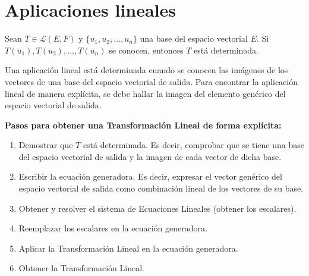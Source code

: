 \documentclass[compacto,10pt]{pubciencias-notas}
\begin{document}
\encabezado
\vspace*{-8mm}

\setcounter{section}{5}
\section{Aplicaciones lineales}
\setcounter{prop}{3}
\begin{prop}
    Sean $T \in \mathscr{L}(E,F)$ y $\{u_1,u_2,\ldots,u_n\}$ una base del espacio vectorial $E$. Si $T(u_1),T(u_2),\ldots,T(u_n)$ se conocen, entonces $T$ está determinada. %
\end{prop}

\begin{obs}
    Una aplicación lineal está determinada cuando se conocen las imágenes de los vectores  de una base del espacio vectorial de salida. Para encontrar la aplicaci\'on lineal de manera expl\'icita, se debe hallar la imagen del elemento genérico del espacio vectorial de salida.
    
    \textbf{Pasos para obtener una Transformación Lineal de forma explícita:}
    \begin{enumerate}
    \item
        Demostrar que $T$ está determinada. Es decir, comprobar que se tiene una base del espacio vectorial de salida y la imagen de cada vector de dicha base.
    \item
        Escribir la ecuación generadora. Es decir, expresar el vector genérico del espacio vectorial de salida como combinación lineal de los vectores de su base.
    \item
        Obtener y resolver el sistema de Ecuaciones Lineales (obtener los escalares).
    \item
        Reemplazar los escalares en la ecuación generadora.
    \item
        Aplicar la Transformación Lineal en la ecuación generadora.
    \item
        Obtener la Transformación Lineal.
    \end{enumerate}

\end{obs}
\end{document}
